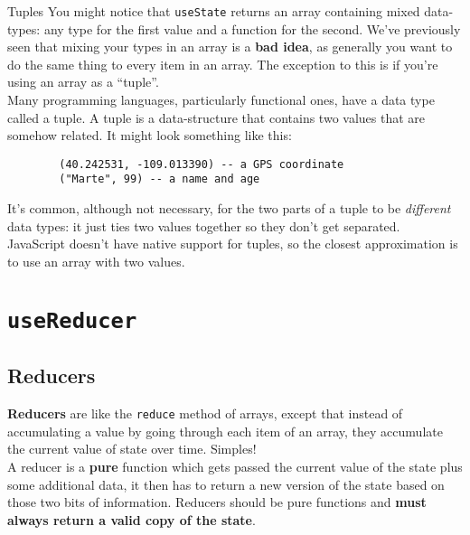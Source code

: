\begin{infobox}{Tuples}
    You might notice that \texttt{useState} returns an array containing mixed data-types: any type for the first value and a function for the second. We've previously seen that mixing your types in an array is a \textbf{bad idea}, as generally you want to do the same thing to every item in an array. The exception to this is if you're using an array as a ``tuple''.
    \\

    Many programming languages, particularly functional ones, have a data type called a tuple. A tuple is a data-structure that contains two values that are somehow related. It might look something like this:

    \begin{verbatim}
        (40.242531, -109.013390) -- a GPS coordinate
        ("Marte", 99) -- a name and age
    \end{verbatim}

    It's common, although not necessary, for the two parts of a tuple to be \textit{different} data types: it just ties two values together so they don't get separated.
    \\

    JavaScript doesn't have native support for tuples, so the closest approximation is to use an array with two values.
\end{infobox}


\section{\texttt{useReducer}}

\subsection{Reducers}

\textbf{Reducers} are like the \texttt{reduce} method of arrays, except that instead of accumulating a value by going through each item of an array, they accumulate the current value of state over time. Simples!
\\

A reducer is a \textbf{pure} function which gets passed the current value of the state plus some additional data, it then has to return a new version of the state based on those two bits of information. Reducers should be pure functions and \textbf{must always return a valid copy of the state}.
\\

